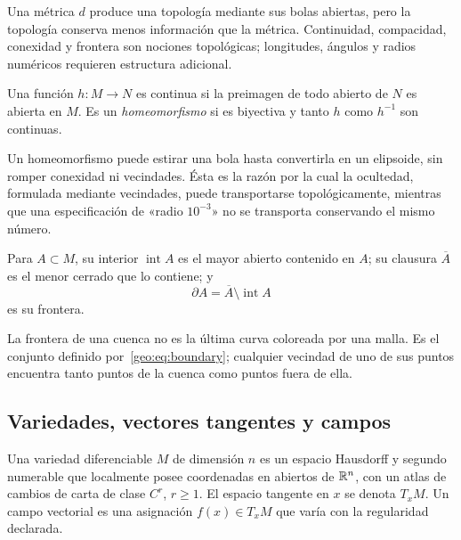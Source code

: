 Una métrica \(d\) produce una topología mediante sus bolas abiertas, pero la
topología conserva menos información que la métrica. Continuidad, compacidad,
conexidad y frontera son nociones topológicas; longitudes, ángulos y radios
numéricos requieren estructura adicional.

\begin{definition}
Una función \(h:M\to N\) es continua si la preimagen de todo abierto de \(N\)
es abierta en \(M\). Es un \emph{homeomorfismo} si es biyectiva y tanto \(h\)
como \(h^{-1}\) son continuas.
\end{definition}

Un homeomorfismo puede estirar una bola hasta convertirla en un elipsoide, sin
romper conexidad ni vecindades. Ésta es la razón por la cual la ocultedad,
formulada mediante vecindades, puede transportarse topológicamente, mientras
que una especificación de «radio \(10^{-3}\)» no se transporta conservando el mismo
número.

\begin{definition}
Para \(A\subset M\), su interior \(\operatorname{int}A\) es el mayor abierto
contenido en \(A\); su clausura \(\overline A\) es el menor cerrado que lo
contiene; y
\begin{equation}
  \partial A=\overline A\setminus\operatorname{int}A
  \label{geo:eq:boundary}
\end{equation}
es su frontera.
\end{definition}

La frontera de una cuenca no es la última curva coloreada por una malla. Es el
conjunto definido por~\eqref{geo:eq:boundary}; cualquier vecindad de uno de sus
puntos encuentra tanto puntos de la cuenca como puntos fuera de ella.

\subsection{Variedades, vectores tangentes y campos}

\begin{definition}
Una variedad diferenciable \(M\) de dimensión \(n\) es un espacio Hausdorff
y segundo numerable que localmente posee coordenadas en abiertos de
\(\mathbb{R}^n\), con un atlas de cambios de carta de clase \(C^r\), \(r\ge1\).
El espacio tangente en \(x\) se denota \(T_xM\). Un campo
vectorial es una asignación \(f(x)\in T_xM\) que varía con la regularidad
declarada.
\end{definition}

